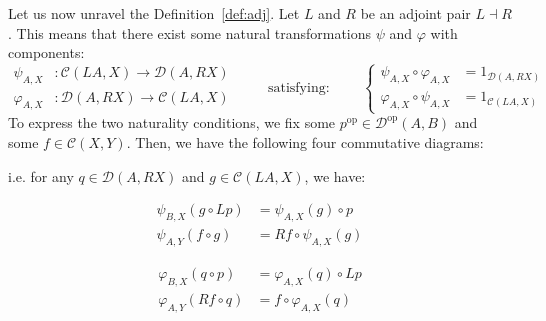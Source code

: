 Let us now unravel the Definition~\ref{def:adj}. Let $L$ and $R$ be an adjoint pair $L\dashv R$. This means that there exist some natural transformations $\psi$ and $\varphi$ with components:
\[\begin{aligned}
\psi_{A,X}&:\mathcal{C}(LA,X)\to\mathcal{D}(A,RX)\\[0.8em]
\varphi_{A,X}&:\mathcal{D}(A,RX)\to\mathcal{C}(LA,X)
\end{aligned}\qquad\text{ satisfying: }\qquad
\left\{\begin{aligned}
\psi_{A,X}\circ\varphi_{A,X}&=1_{\mathcal{D}(A,RX)}\\[0.8em]
\varphi_{A,X}\circ\psi_{A,X}&=1_{\mathcal{C}(LA,X)}
\end{aligned}\right.\]
To express the two naturality conditions, we fix some $p^{\mathrm{op}}\in\mathcal{D}^{\mathrm{op}}(A,B)$ and some $f\in\mathcal{C}(X,Y)$. Then, we have the following four commutative diagrams:
\begin{center}
\end{center}
i.e. for any $q\in\mathcal{D}(A,RX)$ and $g\in\mathcal{C}(LA,X)$, we have:
\begin{center}
\begin{minipage}{0.5\linewidth}
\begin{align}
\psi_{B,X}(g\circ Lp)&=\psi_{A,X}(g)\circ p\label{psiL}\\[1em]
\psi_{A,Y}(f\circ g)&=Rf\circ \psi_{A,X}(g)\label{psiR}
\end{align}
\end{minipage}\begin{minipage}{0.5\linewidth}
\begin{align}
\varphi_{B,X}(q\circ p)&=\varphi_{A,X}(q)\circ Lp\label{phiL}\\[1em]
\varphi_{A,Y}(Rf\circ q)&=f\circ \varphi_{A,X}(q)\label{phiR}
\end{align}
\end{minipage}
\end{center}
